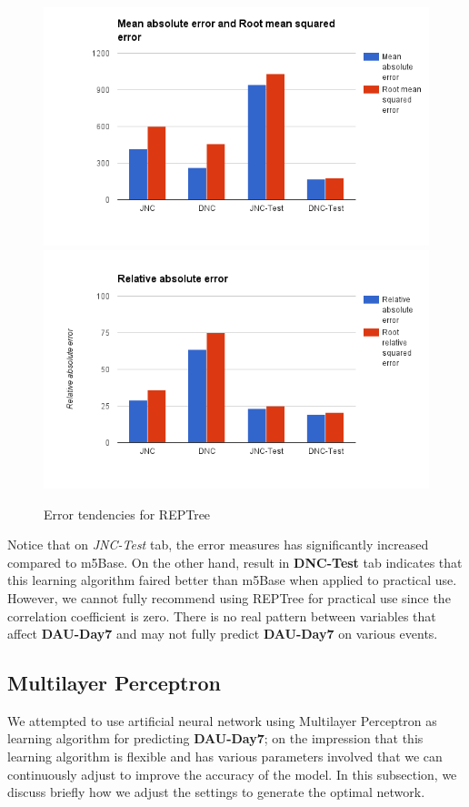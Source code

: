 \begin{figure}[h]
\centering
\includegraphics[scale=0.4]{figures/REPTree_2.png} 
\includegraphics[scale=0.4]{figures/REPTree_3.png} 
\caption{Error tendencies for REPTree}
\label{fig:error_reptree}
\end{figure}

Notice that on \textit{JNC-Test} tab, the error measures has significantly increased compared to m5Base. On the other hand, result in \textbf{DNC-Test} tab indicates that this learning algorithm faired better than m5Base when applied to practical use. However, we cannot fully recommend using REPTree for practical use since the correlation coefficient is zero. There is no real pattern between variables that affect \textbf{DAU-Day7} and may not fully predict \textbf{DAU-Day7} on various events.

\subsection{Multilayer Perceptron}
We attempted to use artificial neural network using Multilayer Perceptron as learning algorithm for predicting \textbf{DAU-Day7}; on the impression that this learning algorithm is flexible and has various parameters involved that we can continuously adjust to improve the accuracy of the model. In this subsection, we discuss briefly how we adjust the settings to generate the optimal network.

